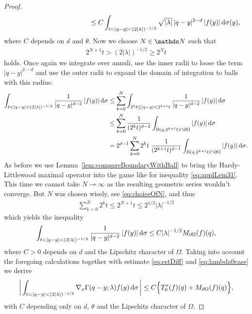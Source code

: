 \begin{proof}
\begin{align}
\begin{alignedat}{1}
       &\hspace{4cm}\leq C \int_{t < |q - y| < (2|\lambda|)^{-1/2}} \sqrt{|\lambda|} \, |q - y|^{2 - d}\, |f(y)| \d\sigma(y),
     \end{alignedat}
   \end{align}
   where $C$ depends on $d$ and $\theta$. 
   Now we choose $N \in \N$ such that 
   \begin{align}
     \label{eq:choiceOfN}
     2^{N + 1} t > (2|\lambda|)^{-1/2} \geq 2^N t
   \end{align}
   holds. 
   Once again we integrate over annuli, use the inner radii to loose the term $|q - y|^{2 - d}$ and use the outer radii to expand the domain of integration to balls with this radius:
   \begin{align*}\int_{t < |q - y| < (2|\lambda|)^{-1/2}} \frac{1}{|q - y|^{d - 2}} \, |f(y)| \, {\operatorname{d}\!{\sigma}}
     &\leq \sum_{k = 0}^N \int_{2^kt \leq |q - y| < 2^{k + 1} t} \frac{1}{|q - y|^{d - 2}}\, |f(y)| \, {\operatorname{d}\!{\sigma}} \\
     &\leq  \sum_{k = 0}^N \frac{1}{(2^{k}t)^{d - 2}}  \int_{\mathrm{B}(q, 2^{k + 1}t) \cap \partial\Omega} |f(y)| \, {\operatorname{d}\!{\sigma}} \\
     &=  2^{d-1} \sum_{k = 0}^N 2^k t \;  \frac{1}{(2^{k + 1}t)^{d - 1}}  \int_{\mathrm{B}(q, 2^{k + 1}t) \cap \partial\Omega} |f(y)| \, {\operatorname{d}\!{\sigma}}.
   \end{align*}
   As before we use Lemma~\ref{lem:compareBoundaryWithBall} to bring the Hardy-Littlewood maximal operator into the game like for inequality \eqref{eq:applLem31}.
   This time we cannot take $N \to \infty$ as the resulting geometric series wouldn't converge. 
   But $N$ was chosen wisely, see \eqref{eq:choiceOfN}, and thus
   \begin{align*}
     \sum_{k = 0}^N 2^k t \leq 2^{N + 1} t \leq 2^{1/2} |\lambda|^{-1/2}
   \end{align*}
   which yields the inequality
   \begin{align*}\int_{t < |q - y| < (2|\lambda|)^{-1/2}} \frac{1}{|q - y|^{d - 2}} \, |f(y)| \, {\operatorname{d}\!{\sigma}}
     \leq C |\lambda|^{-1/2} M_{\partial\Omega}(f)(q),
   \end{align*}
   where $C > 0$ depends on $d$ and the Lipschitz character of $\Omega$.
   Taking into account the foregoing calculations together with estimate \eqref{eq:estDiff} and \eqref{eq:lambda0case} we derive
   \begin{align}
     \label{eq:finalltt}
     \bigg| \int_{t < |q - y| < (2|\lambda|)^{-1/2}} \nabla_x\Gamma(q - y; \lambda) f(y)  \, {\operatorname{d}\!{\sigma}}\, \bigg| \leq C \Big\{ T_0^*(f)(q) + M_{\partial\Omega}(f)(q) \Big\},
   \end{align}
   with $C$ depending only on $d$, $\theta$ and the Lipschitz character of $\Omega$.


\end{proof}
